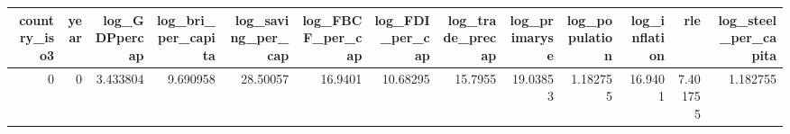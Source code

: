 
\begin{tabular}{rrrrrrrrrrrrr}
\toprule
country\_iso3 & year & log\_GDPpercap & log\_bri\_per\_capita & log\_saving\_per\_cap & log\_FBCF\_per\_cap & log\_FDI\_per\_cap & log\_trade\_precap & log\_primaryse & log\_population & log\_inflation & rle & log\_steel\_per\_capita\\
\midrule
0 & 0 & 3.433804 & 9.690958 & 28.50057 & 16.9401 & 10.68295 & 15.7955 & 19.03853 & 1.182755 & 16.9401 & 7.401755 & 1.182755\\
\bottomrule
\end{tabular}
